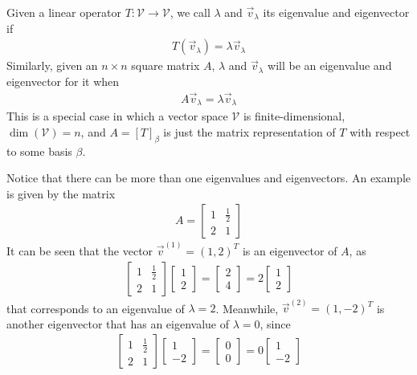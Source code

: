\begin{defn}
\label{defn:eigen}
Given a linear operator $T: \mathcal{V} \to \mathcal{V}$, we call $\lambda$ and $\vec{v}_\lambda$ its eigenvalue and eigenvector if
\begin{align}
T(\vec{v}_\lambda) = \lambda\vec{v}_\lambda
\end{align}
Similarly, given an $n \times n$ square matrix $A$, $\lambda$ and $\vec{v}_\lambda$ will be an eigenvalue and eigenvector for it when
\begin{align}
A\vec{v}_\lambda = \lambda\vec{v}_\lambda \label{eqn:eigenmat}
\end{align}
This is a special case in which a vector space $\mathcal{V}$ is finite-dimensional, $\dim(\mathcal{V}) = n$, and $A = [T]_\beta$ is just the matrix representation of $T$ with respect to some basis $\mathcal{\beta}$.
\end{defn}
Notice that there can be more than one eigenvalues and eigenvectors. An example is given by the matrix
\begin{align*}
A =
\begin{bmatrix}
1 & \frac{1}{2} \\
2 & 1
\end{bmatrix}
\end{align*}
It can be seen that the vector $\vec{v}^{(1)} = (1,2)^T$ is an eigenvector of $A$, as
\begin{align*}
\begin{bmatrix}
1 & \frac{1}{2} \\
2 & 1
\end{bmatrix}
\begin{bmatrix}
1 \\
2
\end{bmatrix}
=
\begin{bmatrix}
2 \\
4
\end{bmatrix}
=
2
\begin{bmatrix}
1 \\
2 
\end{bmatrix}
\end{align*}
that corresponds to an eigenvalue of $\lambda = 2$. Meanwhile, $\vec{v}^{(2)} = (1,-2)^T$ is another eigenvector that has an eigenvalue of $\lambda = 0$, since
\begin{align*}
\begin{bmatrix}
1 & \frac{1}{2} \\
2 & 1
\end{bmatrix}
\begin{bmatrix}
1 \\
-2
\end{bmatrix}
=
\begin{bmatrix}
0 \\
0
\end{bmatrix}
=
0
\begin{bmatrix}
1 \\
-2
\end{bmatrix}
\end{align*}
